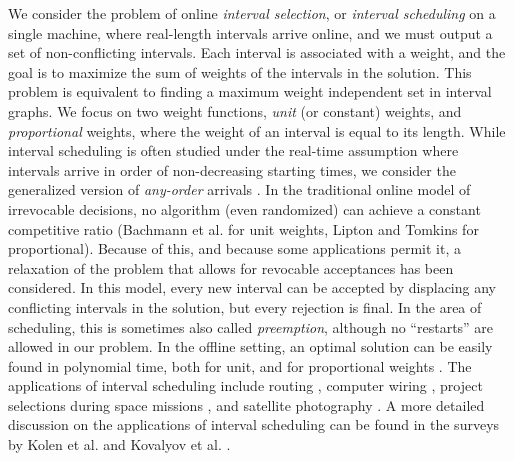 We consider the problem of online \textit{interval selection}, or \textit{interval scheduling} on a single machine, where real-length intervals arrive online, and we must output a set of non-conflicting intervals. Each interval is associated with a weight, and the goal is to maximize the sum of weights of the intervals in the solution. This problem is equivalent to finding a maximum weight independent set in interval graphs. We focus on two weight functions, \textit{unit} (or constant) weights, and \textit{proportional} weights, where the weight of an interval is equal to its length.  While interval scheduling is often studied under the real-time assumption where intervals arrive in order of non-decreasing starting times, we consider the generalized version of \textit{any-order} arrivals \cite{borodin2023any}. In the traditional online model of irrevocable decisions, no algorithm (even randomized) can achieve a constant competitive ratio (Bachmann et al. \cite{bachmann2013online} for unit weights, Lipton and Tomkins \cite{lipton1994online} for proportional). Because of this, and because some applications permit it, a relaxation of the problem that allows for revocable acceptances has been considered. In this model, every new interval can be accepted by displacing any conflicting intervals in the solution, but every rejection is final. In the area of scheduling, this is sometimes also called \textit{preemption}, although no ``restarts'' are allowed in our problem. In the offline setting, an optimal solution can be easily found in polynomial time, both for unit, and for proportional weights \cite{kleinberg2006algorithm}. The applications of interval scheduling include routing \cite{plotkin1995competitive}, computer wiring \cite{gupta1979optimal}, project selections during space missions \cite{hall1994maximizing}, and satellite photography \cite{gabrel1995scheduling}. A more detailed discussion on the applications of interval scheduling can be found in the surveys by Kolen et al. \cite{kolen2007interval} and Kovalyov et al. \cite{kovalyov2007fixed}.\\\\
